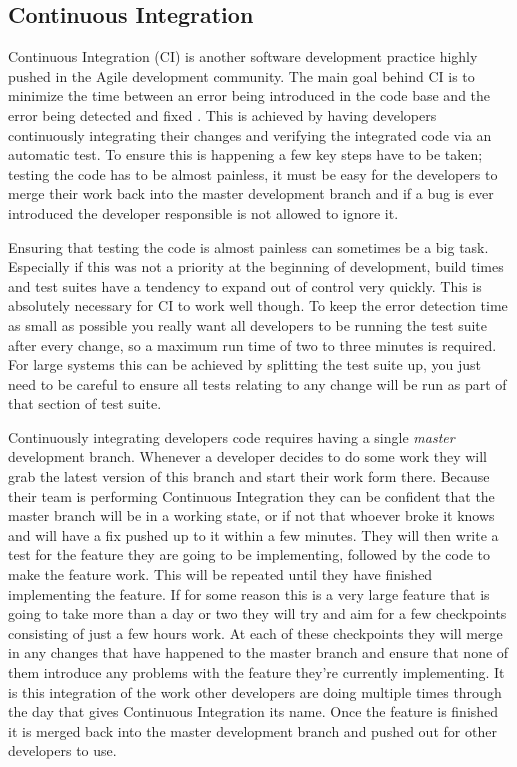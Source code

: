 \subsection{Continuous Integration}

  Continuous Integration (CI) is another software development practice highly
  pushed in the Agile development community.  The main goal behind CI is to
  minimize the time between an error being introduced in the code base and the
  error being detected and fixed \cite{Fowler_2006}.  This is achieved by having developers
  continuously integrating their changes and verifying the integrated code via
  an automatic test.  To ensure this is happening a few key steps have to be
  taken; testing the code has to be almost painless, it must be easy for the
  developers to merge their work back into the master development branch and if
  a bug is ever introduced the developer responsible is not allowed to ignore
  it.

  Ensuring that testing the code is almost painless can sometimes be a big task.
  Especially if this was not a priority at the beginning of development, build
  times and test suites have a tendency to expand out of control very quickly.
  This is absolutely necessary for CI to work well though.  To keep the error
  detection time as small as possible you really want all developers to be
  running the test suite after every change, so a maximum run time of two to
  three minutes is required.  For large systems this can be achieved by
  splitting the test suite up, you just need to be careful to ensure all tests
  relating to any change will be run as part of that section of test suite.

  Continuously integrating developers code requires having a single
  \emph{master} development branch.  Whenever a developer decides to do some
  work they will grab the latest version of this branch and start their work
  form there.  Because their team is performing Continuous Integration they can
  be confident that the master branch will be in a working state, or if not that
  whoever broke it knows and will have a fix pushed up to it within a few
  minutes.  They will then write a test for the feature they are going to be
  implementing, followed by the code to make the feature work.  This will be
  repeated until they have finished implementing the feature.  If for some
  reason this is a very large feature that is going to take more than a day or
  two they will try and aim for a few checkpoints consisting of just a few hours
  work.  At each of these checkpoints they will merge in any changes that have
  happened to the master branch and ensure that none of them introduce any
  problems with the feature they're currently implementing.  It is this
  integration of the work other developers are doing multiple times through the
  day that gives Continuous Integration its name.  Once the feature is finished
  it is merged back into the master development branch and pushed out for other
  developers to use.

